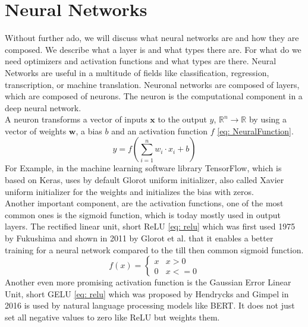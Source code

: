 \section{Neural Networks}\label{sec:neural-networks}
Without further ado, we will discuss what neural networks are and how they are composed.
We describe what a layer is and what types there are.
For what do we need optimizers and activation functions and what types are there.
Neural Networks are useful in a multitude of fields like classification, regression, transcription, or machine translation. \cite{goodfellow_deep_2016}
Neuronal networks are composed of layers, which are composed of neurons.
The neuron is the computational component in a deep neural network.\\
A neuron transforms a vector of inputs $\mathbf{x}$ to the output $y$, $\mathbb{R}^n \to \mathbb{R}$
by using a vector of weights $\mathbf{w}$, a bias $b$ and an activation function $f$ \ref{eq: NeuralFunction}.
\begin{equation}
    y = f\left( \sum^n_{i=1} w_i\cdot x_i + b\right)
    \label{eq: NeuralFunction}
\end{equation}
For Example, in the machine learning software library TensorFlow, which is based on Keras, uses by default Glorot uniform initializer\cite{noauthor_tfkeraslayersdense_2023,glorot_understanding_2010},
also called Xavier uniform initializer for the weights and initializes the bias with zeros.\\
Another important component, are the activation functions, one of the most common ones is the sigmoid function, which is today mostly used in output layers.
The rectified linear unit, short ReLU \ref{eq: relu} which was first used 1975 by Fukushima\cite{fukushima_cognitron_1975} and shown in 2011 by Glorot et al. \cite{glorot_deep_2011}
that it enables a better training for a neural network compared to the till then common sigmoid function.
\begin{equation}
    f(x) =
    \begin{cases}
        x& x > 0\\
        0& x <= 0
    \end{cases}
    \label{eq: relu}
\end{equation}
Another even more promising activation function is the Gaussian Error Linear Unit, short GELU \ref{eq: relu} which was proposed by Hendrycks and Gimpel in 2016\cite{hendrycks_gaussian_2016} is used by natural language processing models like BERT\cite{devlin_bert_2019}.
It does not just set all negative values to zero like ReLU but weights them.
